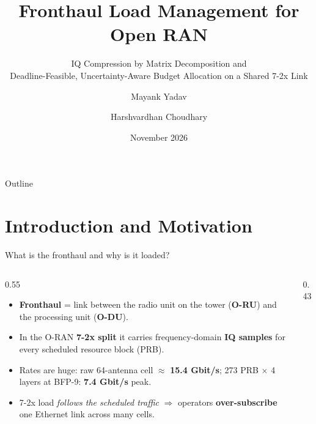 \documentclass[aspectratio=169,11pt,xcolor=table]{beamer}
\title[Fronthaul Load Management in O-RAN]{Fronthaul Load Management for Open RAN}
\subtitle{IQ Compression by Matrix Decomposition and\\
Deadline-Feasible, Uncertainty-Aware Budget Allocation on a Shared 7-2x Link}
\author[M.~Yadav \& H.~Choudhary]{Mayank Yadav \and Harshvardhan Choudhary}
\institute[B.Tech. Project]{B.Tech. Project --- Final Evaluation}
\date{November 2026}
\newcommand{\hl}[1]{\textcolor{accent}{\textbf{#1}}}
\begin{document}
\begin{frame}
  \titlepage
\end{frame}

\begin{frame}{Outline}
  \tableofcontents[hideallsubsections]
\end{frame}

\section{Introduction and Motivation}

\begin{frame}{What is the fronthaul and why is it loaded?}
  \small
  \begin{columns}[T]
    \begin{column}{0.55\textwidth}
      \begin{itemize}
        \item \textbf{Fronthaul} = link between the radio unit on the tower (\textbf{O-RU}) and the processing unit (\textbf{O-DU}).
        \item In the O-RAN \textbf{7-2x split} it carries frequency-domain \textbf{IQ samples} for every scheduled resource block (PRB).
        \item Rates are huge: raw 64-antenna cell $\approx$ \hl{15.4 Gbit/s}; 273 PRB $\times$ 4 layers at BFP-9: \hl{7.4 Gbit/s} peak.
        \item 7-2x load \emph{follows the scheduled traffic} $\Rightarrow$ operators \textbf{over-subscribe} one Ethernet link across many cells.
      \end{itemize}
    \end{column}
    \begin{column}{0.43\textwidth}
      \centering
\end{column}
\end{columns}
\end{frame}
\end{document}
